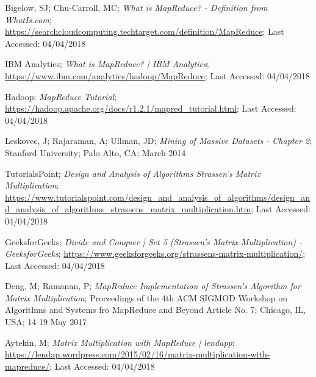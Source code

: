 \documentclass[10pt, conference]{IEEEtran}
\begin{document}
\begin{thebibliography}{}

Bigelow, SJ; Chu-Carroll, MC; \emph{What is MapReduce? - Definition from WhatIs.com}; \url{https://searchcloudcomputing.techtarget.com/definition/MapReduce}; Last Accessed: 04/04/2018

IBM Analytics; \emph{What is MapReduce? | IBM Analytics}; \url{https://www.ibm.com/analytics/hadoop/MapReduce}; Last Accessed: 04/04/2018

Hadoop; \emph{MapReduce Tutorial}; \url{https://hadoop.apache.org/docs/r1.2.1/mapred_tutorial.html}; Last Accessed: 04/04/2018

Leskovec, J; Rajaraman, A; Ullman, JD; \emph{Mining of Massive Datasets - Chapter 2}; Stanford University; Palo Alto, CA; March 2014

TutorialsPoint; \emph{Design and Analysis of Algorithms Strassen’s Matrix Multiplication}; \url{https://www.tutorialspoint.com/design_and_analysis_of_algorithms/design_and_analysis_of_algorithms_strassens_matrix_multiplication.htm}; Last Accessed: 04/04/2018

GeeksforGeeks; \emph{Divide and Conquer | Set 5 (Strassen's Matrix Multiplication) - GeeksforGeeks}; \url{https://www.geeksforgeeks.org/strassens-matrix-multiplication/}; Last Accessed: 04/04/2018

Deng, M; Ramanan, P; \emph{MapReduce Implementation of Strassen's Algorithm for Matrix Multiplication}; Proceedings of the 4th ACM SIGMOD Workshop on Algorithms and Systems fro MapReduce and Beyond Article No. 7; Chicago, IL, USA; 14-19 May 2017

Aytekin, M; \emph{Matrix Multiplication with MapReduce | lendapp}; \url{https://lendap.wordpress.com/2015/02/16/matrix-multiplication-with-mapreduce/}; Last Accessed: 04/04/2018

\end{thebibliography}




\end{document}

